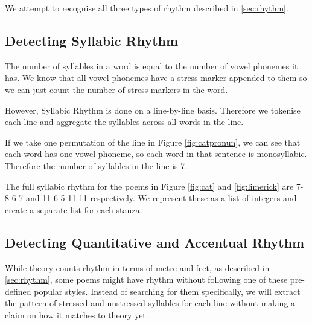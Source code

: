 We attempt to recognise all three types of rhythm described in \ref{sec:rhythm}. 

\subsection{Detecting Syllabic Rhythm}

The number of syllables in a word is equal to the number of vowel phonemes it has. We know that all vowel phonemes have a stress marker appended to them so we can just count the number of stress markers in the word.

However, Syllabic Rhythm is done on a line-by-line basis. Therefore we tokenise each line and aggregate the syllables across all words in the line.

If we take one permutation of the line in Figure \ref{fig:catpronun}, we can see that each word has one vowel phoneme, so each word in that sentence is monosyllabic. Therefore the number of syllables in the line is 7.

The full syllabic rhythm for the poems in Figure \ref{fig:cat} and \ref{fig:limerick} are 7-8-6-7 and 11-6-5-11-11 respectively. We represent these as a list of integers and create a separate list for each stanza.

\subsection{Detecting Quantitative and Accentual Rhythm}

While theory counts rhythm in terms of metre and feet, as described in \ref{sec:rhythm}, some poems might have rhythm without following one of these pre-defined popular styles. Instead of searching for them specifically, we will extract the pattern of stressed and unstressed syllables for each line without making a claim on how it matches to theory yet.

